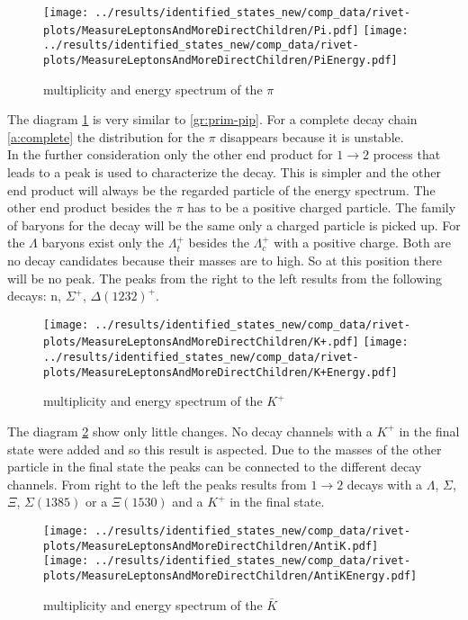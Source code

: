 \begin{figure}[h]
  \centering
  \texttt{[image: ../results/identified\_states\_new/comp\_data/rivet-plots/MeasureLeptonsAndMoreDirectChildren/Pi.pdf]}
  \texttt{[image: ../results/identified\_states\_new/comp\_data/rivet-plots/MeasureLeptonsAndMoreDirectChildren/PiEnergy.pdf]}
  \caption{multiplicity and energy spectrum of the \(\pi\)} \label{gr:prim-pi}
\end{figure}
The diagram {\ref{gr:prim-pi}} is very similar to {\ref{gr:prim-pip}}. For a 
complete decay chain {\ref{a:complete}} the distribution for the \(\pi\) 
disappears because it is unstable.\\
In the further consideration only the other end product for \( 1 \rightarrow 2 \) process
that leads to a peak is used to characterize the decay. This is simpler and the 
other end product will always be the regarded particle of the energy spectrum. 
The other end product besides the \(\pi\) has to be a positive charged particle. 
The family of baryons for the decay will be the same only a charged particle is 
picked up. For the \(\Lambda\) baryons exist only the \(\Lambda_t^+\) besides 
the \(\Lambda_c^+\) with a positive charge. Both are no decay candidates because 
their masses are to high. So at this position there will be no peak. The 
peaks from the right to the left results from the following decays:
n, \(\Sigma^+\), \(\Delta(1232)^+\).
\begin{figure}[h]
  \centering
  \texttt{[image: ../results/identified\_states\_new/comp\_data/rivet-plots/MeasureLeptonsAndMoreDirectChildren/K+.pdf]}
  \texttt{[image: ../results/identified\_states\_new/comp\_data/rivet-plots/MeasureLeptonsAndMoreDirectChildren/K+Energy.pdf]}
  \caption{multiplicity and energy spectrum of the \(K^+\)} \label{gr:prim-Kp}
\end{figure}
The diagram {\ref{gr:prim-Kp}} show only little changes. No decay channels 
with a \(K^+\) in the final state were added and so this result is aspected. 
Due to the masses of the other particle in the final state the peaks can be 
connected to the different decay channels. From right to the left the peaks 
results from \( 1 \rightarrow 2 \) decays with a \(\Lambda\), \(\Sigma\), \(\Xi\),
\(\Sigma(1385)\) or a \(\Xi(1530)\) and a \(K^+\) in the final state.
\begin{figure}[h]
  \centering
  \texttt{[image: ../results/identified\_states\_new/comp\_data/rivet-plots/MeasureLeptonsAndMoreDirectChildren/AntiK.pdf]}
  \texttt{[image: ../results/identified\_states\_new/comp\_data/rivet-plots/MeasureLeptonsAndMoreDirectChildren/AntiKEnergy.pdf]}
  \caption{multiplicity and energy spectrum of the \(\bar{K}\)} \label{gr:prim-Kb}
\end{figure}
